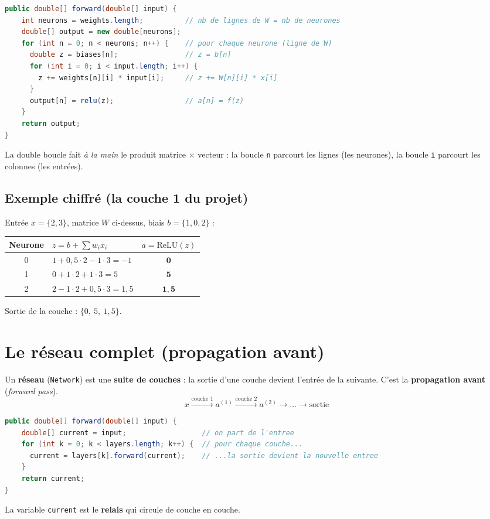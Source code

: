\documentclass[11pt]{article}
\begin{document}
\begin{lstlisting}[language=Java]
public double[] forward(double[] input) {
    int neurons = weights.length;          // nb de lignes de W = nb de neurones
    double[] output = new double[neurons];
    for (int n = 0; n < neurons; n++) {    // pour chaque neurone (ligne de W)
      double z = biases[n];                // z = b[n]
      for (int i = 0; i < input.length; i++) {
        z += weights[n][i] * input[i];     // z += W[n][i] * x[i]
      }
      output[n] = relu(z);                 // a[n] = f(z)
    }
    return output;
}
\end{lstlisting}

La double boucle fait \emph{à la main} le produit matrice $\times$ vecteur : la
boucle \texttt{n} parcourt les lignes (les neurones), la boucle \texttt{i}
parcourt les colonnes (les entrées).

\subsection{Exemple chiffré (la couche 1 du projet)}
Entrée $x = \{2,3\}$, matrice $W$ ci-dessus, biais $b = \{1,0,2\}$ :
\begin{center}
\begin{tabular}{c l c}
\toprule
\textbf{Neurone} & $z = b + \sum w_i x_i$ & $a = \mathrm{ReLU}(z)$ \\
\midrule
0 & $1 + 0{,}5\cdot 2 - 1\cdot 3 = -1$    & $\mathbf{0}$   \\
1 & $0 + 1\cdot 2 + 1\cdot 3 = 5$         & $\mathbf{5}$   \\
2 & $2 - 1\cdot 2 + 0{,}5\cdot 3 = 1{,}5$ & $\mathbf{1{,}5}$ \\
\bottomrule
\end{tabular}
\end{center}
Sortie de la couche : $\{0,\ 5,\ 1{,}5\}$.

\section{Le réseau complet (propagation avant)}

Un \textbf{réseau} (\texttt{Network}) est une \textbf{suite de couches} : la sortie
d'une couche devient l'entrée de la suivante. C'est la \textbf{propagation avant}
(\emph{forward pass}).
\[
x \xrightarrow{\text{couche 1}} a^{(1)} \xrightarrow{\text{couche 2}} a^{(2)}
\longrightarrow \dots \longrightarrow \text{sortie}
\]
\begin{lstlisting}[language=Java]
public double[] forward(double[] input) {
    double[] current = input;                  // on part de l'entree
    for (int k = 0; k < layers.length; k++) {  // pour chaque couche...
      current = layers[k].forward(current);    // ...la sortie devient la nouvelle entree
    }
    return current;
}
\end{lstlisting}
La variable \texttt{current} est le \textbf{relais} qui circule de couche en couche.
\end{document}
